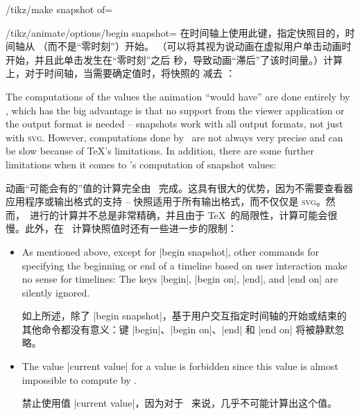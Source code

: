 \begin{key}{/tikz/make snapshot of=}
\begin{key}{/tikz/animate/options/begin snapshot=}
        在时间轴上使用此键，指定快照目的，时间轴从 （而不是“零时刻”）开始。 （可以将其视为说动画在虚拟用户单击动画时开始，并且此单击发生在“零时刻”之后  秒，导致动画“滞后”了该时间量。）计算上，对于时间轴，当需要确定值时，将快照的  减去 ：


\begin{codeexample}[preamble={\usetikzlibrary{animations}}]
\end{codeexample}
    \end{key}

    The computations of the values the animation ``would have'' are done
    entirely by \tikzname, which has the big advantage is that no support from
    the viewer application or the output format is needed -- snapshots work
    with all output formats, not just with \textsc{svg}. However, computations
    done by \tikzname\ are not always very precise and can be slow because of
    \TeX's limitations. In addition, there are some further limitations when it
    comes to \tikzname's computation of snapshot values:
    
    动画“可能会有的”值的计算完全由 \tikzname\ 完成。这具有很大的优势，因为不需要查看器应用程序或输出格式的支持 -- 快照适用于所有输出格式，而不仅仅是 \textsc{svg}。然而，\tikzname\ 进行的计算并不总是非常精确，并且由于 \TeX\ 的局限性，计算可能会很慢。此外，在 \tikzname\ 计算快照值时还有一些进一步的限制：


    \begin{itemize}
        \item As mentioned above, except for |begin snapshot|, other commands
            for specifying the beginning or end of a timeline based on user
            interaction make no sense for timelines: The keys |begin|,
            |begin on|, |end|, and |end on| are silently ignored.

            如上所述，除了 |begin snapshot|，基于用户交互指定时间轴的开始或结束的其他命令都没有意义：键 |begin|、|begin on|、|end| 和 |end on| 将被静默忽略。


        \item The value |current value| for a value is forbidden since this
            value is almost impossible to compute by \tikzname.

            禁止使用值 |current value|，因为对于 \tikzname\ 来说，几乎不可能计算出这个值。



\end{itemize}
\end{key}
